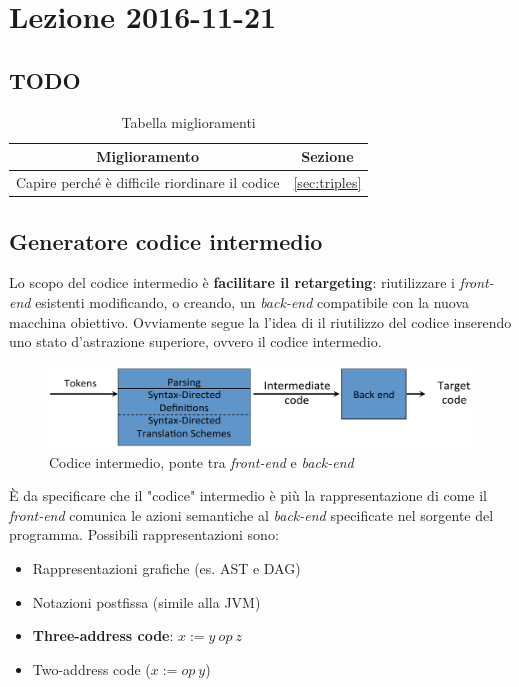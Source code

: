 \section{Lezione 2016-11-21}
\subsection{TODO}
\begin{table}[H]
\begin{center}
\begin{tabular}{|p{\textwidth}|c|}
\hline
\multicolumn{1}{|c|}{\textbf{Miglioramento}} & \textbf{Sezione} \\ \hline
Capire perch\'e \`e difficile riordinare il codice &
\ref{sec:triples} \\ \hline
\end{tabular}
\end{center}
\caption{Tabella miglioramenti}
\label{tab:tab_todo}
\end{table}

\subsection{Generatore codice intermedio}
Lo scopo del codice intermedio \`e \textbf{facilitare il retargeting}:
riutilizzare i \textit{front-end} esistenti modificando, o creando, un
\textit{back-end} compatibile con la nuova macchina obiettivo. Ovviamente segue
la l'idea di il riutilizzo del codice inserendo uno stato d'astrazione
superiore, ovvero il codice intermedio.

\begin{figure}[H]
  \includegraphics[scale=0.4]{res/image/compiler_backend}
  \caption{Codice intermedio, ponte tra \textit{front-end} e \textit{back-end}}
  \label{img:compiler_backend}
\end{figure}

\`E da specificare che il "codice" intermedio \`e pi\`u la rappresentazione
di come il \textit{front-end} comunica le azioni semantiche al
\textit{back-end} specificate nel sorgente del programma. Possibili
rappresentazioni sono:
\begin{itemize}
\item Rappresentazioni grafiche (es. AST e DAG)
\item Notazioni postfissa (simile alla JVM)
\item \textbf{Three-address code}: $x := y \ op \ z$
\item Two-address code ($x := op \ y$)
\end{itemize}

